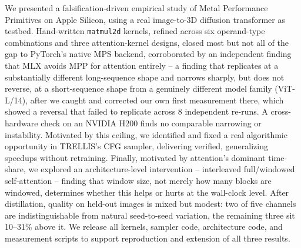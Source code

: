 \documentclass{article}
\newcommand{\code}[1]{\texttt{#1}}
\begin{document}
We presented a falsification-driven empirical study of Metal Performance Primitives on Apple
Silicon, using a real image-to-3D diffusion transformer as testbed. Hand-written \code{matmul2d}
kernels, refined across six operand-type combinations and three attention-kernel designs, closed
most but not all of the gap to PyTorch's native MPS backend, corroborated by an independent finding
that MLX avoids MPP for attention entirely -- a finding that replicates at a substantially
different long-sequence shape and narrows sharply, but does not reverse, at a short-sequence shape
from a genuinely different model family (ViT-L/14), after we caught and corrected our own first
measurement there, which showed a reversal that failed to replicate across 8 independent re-runs.
A cross-hardware check on an NVIDIA H200 finds no comparable narrowing or instability. Motivated by
this ceiling, we identified and fixed a
real algorithmic opportunity in TRELLIS's CFG sampler, delivering verified, generalizing speedups
without retraining. Finally, motivated by attention's dominant time-share, we explored an
architecture-level intervention -- interleaved full/windowed self-attention -- finding that window
size, not merely how many blocks are windowed, determines whether this helps or hurts at the
wall-clock level. After distillation, quality on held-out images is mixed but modest: two of five
channels are indistinguishable from natural seed-to-seed variation, the remaining three sit
10--31\% above it. We release all kernels, sampler code, architecture code, and measurement
scripts to support reproduction and extension of all three results.
\end{document}
